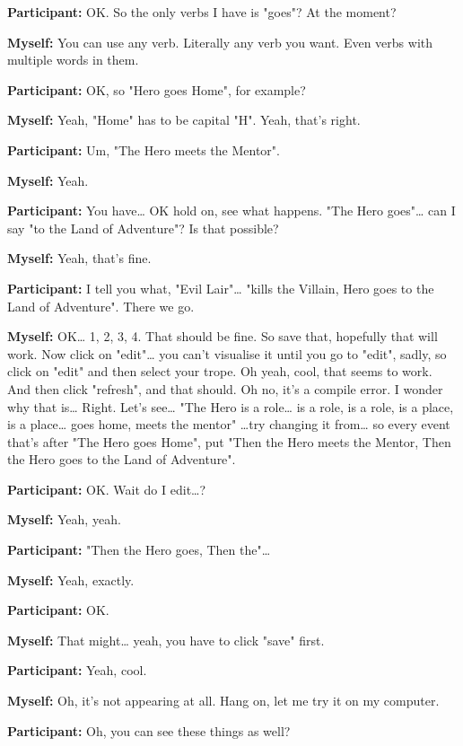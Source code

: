 \documentclass[11pt]{report}
\newcommand{\llabel}[1]{\hypertarget{llineno:#1}{\linelabel{#1}}}
\begin{document}
\begin{linenumbers}
\textbf{Participant:} OK. So the only verbs I have is "goes"? At the moment?

\textbf{Myself:} You can use any verb. Literally any verb you want. Even verbs with multiple words in them.

\textbf{Participant:} OK, so "Hero goes Home", for example?

\textbf{Myself:} Yeah, "Home" has to be capital "H". Yeah, that's right.\llabel{lne:syntax5e}

\textbf{Participant:} Um, "The Hero meets the Mentor".

\textbf{Myself:} Yeah.

\textbf{Participant:} You have\ldots{} OK hold on, see what happens. "The Hero goes"\ldots{} can I say "to the Land of Adventure"? Is that possible?

\textbf{Myself:} Yeah, that's fine.

\textbf{Participant:} I tell you what, "Evil Lair"\ldots{} "kills the Villain, Hero goes to the Land of Adventure". There we go.

\textbf{Myself:} OK\ldots{} 1, 2, 3, 4. That should be fine. So save that, hopefully that will work. Now click on "edit"\ldots{} you can't visualise it until you go to "edit", sadly, so click on "edit" and then select your trope. Oh yeah, cool, that seems to work. And then click "refresh", and that should. Oh no, it's a compile error. I wonder why that is\ldots{} Right. Let's see\ldots{} "The Hero is a role\ldots{} is a role, is a role, is a place, is a place\ldots{} goes home, meets the mentor" \ldots{}try changing it from\ldots{} so every event that's after "The Hero goes Home", put "Then the Hero meets the Mentor, Then the Hero goes to the Land of Adventure".

\textbf{Participant:} OK. Wait do I edit\ldots{}?

\textbf{Myself:} Yeah, yeah.

\textbf{Participant:} "Then the Hero goes, Then the"\ldots{}

\textbf{Myself:} Yeah, exactly.

\textbf{Participant:} OK.

\textbf{Myself:} That might\ldots{} yeah, you have to click "save" first.

\textbf{Participant:} Yeah, cool.

\textbf{Myself:} Oh, it's not appearing at all. Hang on, let me try it on my computer.

\textbf{Participant:} Oh, you can see these things as well?


\end{linenumbers}
\end{document}
